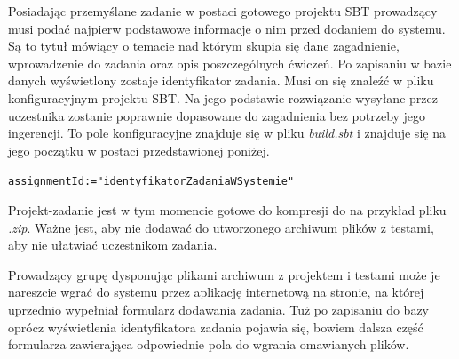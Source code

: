 \documentclass[brudnopis]{xmgr}
\begin{document}
Posiadając przemyślane zadanie w postaci gotowego projektu SBT prowadzący musi podać najpierw podstawowe informacje o nim przed dodaniem do systemu. Są to tytuł mówiący o temacie nad którym skupia się dane zagadnienie, wprowadzenie do zadania oraz opis poszczególnych ćwiczeń. Po zapisaniu w bazie danych wyświetlony zostaje identyfikator zadania. Musi on się znaleźć w pliku konfiguracyjnym projektu SBT. Na jego podstawie rozwiązanie wysyłane przez uczestnika zostanie poprawnie dopasowane do zagadnienia bez potrzeby jego ingerencji. To pole konfiguracyjne znajduje się w pliku \emph{build.sbt} i znajduje się na jego początku w postaci przedstawionej poniżej.

\begin{alltt}
assignmentId := "identyfikatorZadaniaWSystemie"
\end{alltt}

Projekt-zadanie jest w tym momencie gotowe do kompresji do na przykład pliku \emph{.zip}. Ważne jest, aby nie dodawać do utworzonego archiwum plików z testami, aby nie ułatwiać uczestnikom zadania. 

Prowadzący grupę dysponując plikami archiwum z projektem i testami może je nareszcie wgrać do systemu przez aplikację internetową na stronie, na której uprzednio wypełniał formularz dodawania zadania. Tuż po zapisaniu do bazy oprócz wyświetlenia identyfikatora zadania pojawia się, bowiem dalsza część formularza zawierająca odpowiednie pola do wgrania omawianych plików.
\end{document}
